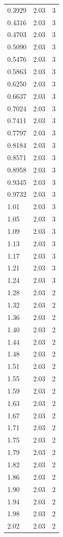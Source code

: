 \begin{longtable}{lrr}
  0.3929 & 2.03 & 3 \\
  0.4316 & 2.03 & 3 \\
  0.4703 & 2.03 & 3 \\
  0.5090 & 2.03 & 3 \\
  0.5476 & 2.03 & 3 \\
  0.5863 & 2.03 & 3 \\
  0.6250 & 2.03 & 3 \\
  0.6637 & 2.03 & 3 \\
  0.7024 & 2.03 & 3 \\
  0.7411 & 2.03 & 3 \\
  0.7797 & 2.03 & 3 \\
  0.8184 & 2.03 & 3 \\
  0.8571 & 2.03 & 3 \\
  0.8958 & 2.03 & 3 \\
  0.9345 & 2.03 & 3 \\
  0.9732 & 2.03 & 3 \\
  1.01 & 2.03 & 3 \\
  1.05 & 2.03 & 3 \\
  1.09 & 2.03 & 3 \\
  1.13 & 2.03 & 3 \\
  1.17 & 2.03 & 3 \\
  1.21 & 2.03 & 3 \\
  1.24 & 2.03 & 3 \\
  1.28 & 2.03 & 2 \\
  1.32 & 2.03 & 2 \\
  1.36 & 2.03 & 2 \\
  1.40 & 2.03 & 2 \\
  1.44 & 2.03 & 2 \\
  1.48 & 2.03 & 2 \\
  1.51 & 2.03 & 2 \\
  1.55 & 2.03 & 2 \\
  1.59 & 2.03 & 2 \\
  1.63 & 2.03 & 2 \\
  1.67 & 2.03 & 2 \\
  1.71 & 2.03 & 2 \\
  1.75 & 2.03 & 2 \\
  1.79 & 2.03 & 2 \\
  1.82 & 2.03 & 2 \\
  1.86 & 2.03 & 2 \\
  1.90 & 2.03 & 2 \\
  1.94 & 2.03 & 2 \\
  1.98 & 2.03 & 2 \\
  2.02 & 2.03 & 2 \\

\end{longtable}
